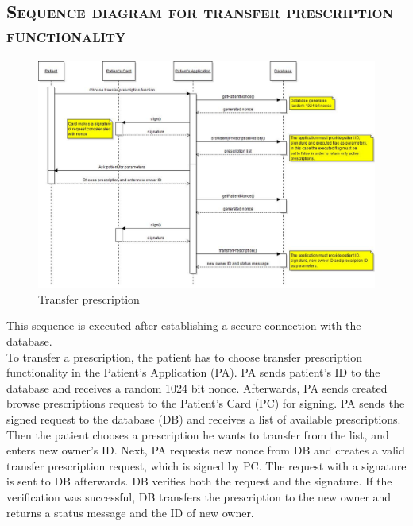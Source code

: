 \documentclass[12pt,titlepage]{article}
\begin{document}
\FloatBarrier

\newpage
\subsection{\textsc{Sequence diagram for transfer prescription functionality}}
\begin{figure}[!h]
\includegraphics[width=\linewidth]{transferPrescriptionSequenceDiagram}
\caption{Transfer prescription}
\end{figure}
This sequence is executed after establishing a secure connection with the database.\\

To transfer a prescription, the patient has to choose transfer prescription functionality in the Patient’s Application (PA). 
PA sends patient’s ID to the database and receives a random 1024 bit nonce. 
Afterwards, PA sends created browse prescriptions request to the Patient’s Card (PC) for signing. 
PA sends the signed request to the database (DB) and receives a list of available prescriptions. 
Then the patient chooses a prescription he wants to transfer from the list, and enters new owner’s ID.
Next, PA requests new nonce from DB and creates a valid transfer prescription request, which is signed by PC. 
The request with a signature is sent to DB afterwards. 
DB verifies both the request and the signature. If the verification was successful, DB transfers the prescription to the new owner and returns a status message and the ID of new owner.
\FloatBarrier

\newpage
\end{document}
